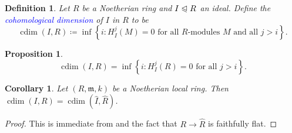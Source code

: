 \documentclass[10pt]{article}
\theoremstyle{thmstyle}
\newtheorem{proposition}[theorem]{Proposition}
\theoremstyle{defstyle}
\newtheorem{definition}[theorem]{Definition}
\newtheorem{corollary}[theorem]{Corollary}
\newcommand{\frakm}{\mathfrak{m}} %
\newcommand{\wh}[1]{\widehat{#1}}
\newcommand{\define}[1]{\textcolor{blue}{\textit{#1}}}
\newcommand{\noreq}{\trianglelefteqslant}
\newcommand{\cdim}{\operatorname{cdim}}
\begin{document}
\begin{definition}
	Let $R$ be a Noetherian ring and $I\noreq R$ an ideal. Define the \define{cohomological dimension} of $I$ in $R$ to be 
	\begin{equation*}
		\cdim(I, R)\coloneq\inf\left\{i\colon H^j_I(M) = 0\text{ for all $R$-modules $M$ and all $j > i$}\right\}.
	\end{equation*}
\end{definition}

\begin{proposition}
	\begin{equation*}
		\cdim(I, R) = \inf\left\{i\colon H^j_I(R) = 0 \text{ for all }j > i\right\}.
	\end{equation*}
\end{proposition}

\begin{corollary}
	Let $(R,\frakm, k)$ be a Noetherian local ring. Then $\cdim(I, R) = \cdim(\wh I,\wh R)$.
\end{corollary}
\begin{proof}
	This is immediate from  and the fact that $R\to\wh R$ is faithfully flat.
\end{proof}



\end{document}
